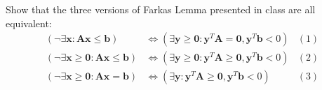 



    \begin{thm}{}{}
        Show that the three versions of Farkas Lemma presented in class are all equivalent:
        \begin{align*}
            (\neg \exists \mathbf{x}: \mathbf{A}\mathbf{x}\le \mathbf{b}) &\iff (\exists \mathbf{y}\ge \mathbf{0} :\mathbf{y}^{T}\mathbf{A}=\mathbf{0},\mathbf{y}^{T}\mathbf{b}<0) &(1)\\
            (\neg \exists \mathbf{x}\ge \mathbf{0}: \mathbf{A}\mathbf{x}\le \mathbf{b}) &\iff (\exists \mathbf{y}\ge \mathbf{0} :\mathbf{y}^{T}\mathbf{A}\ge \mathbf{0},\mathbf{y}^{T}\mathbf{b}<0) &(2)\\
            (\neg \exists \mathbf{x}\ge \mathbf{0}: \mathbf{A}\mathbf{x}= \mathbf{b}) &\iff (\exists \mathbf{y} :\mathbf{y}^{T}\mathbf{A}\ge \mathbf{0},\mathbf{y}^{T}\mathbf{b}<0)&(3)
        \end{align*}
    \end{thm}
